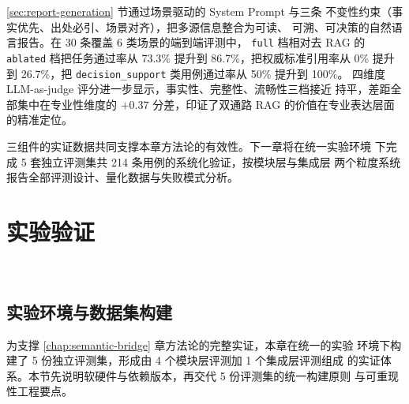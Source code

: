 \documentclass[a4paper]{article}
\newcommand{\sectionbreak}{\clearpage} %
\theoremstyle{definition}
\theoremstyle{plain}
\theoremstyle{remark}
\newcommand{\reftab}[1]{表 \ref{#1}}
\let\oldcite\cite
\renewcommand{\cite}[1]{\textsuperscript{\oldcite{#1}}}
\newcommand{\bk}{\discretionary{}{}{}}
\begin{document}
\ref{sec:report-generation} 节通过场景驱动的 System Prompt 与三条
不变性约束（事实优先、出处必引、场景对齐），把多源信息整合为可读、
可溯、可决策的自然语言报告。在 30 条覆盖 6 类场景的端到端评测中，
\texttt{full} 档相对去 RAG 的 \texttt{ablated} 档把任务通过率从
73.3\% 提升到 86.7\%，把权威标准引用率从 0\% 提升到 26.7\%，把
\texttt{decision\_\bk{}support} 类用例通过率从 50\% 提升到 100\%。
四维度 LLM-as-judge 评分进一步显示，事实性、完整性、流畅性三档接近
持平，差距全部集中在专业性维度的 $+0.37$ 分差，印证了双通路 RAG
的价值在专业表达层面的精准定位。

三组件的实证数据共同支撑本章方法论的有效性。下一章将在统一实验环境
下完成 5 套独立评测集共 214 条用例的系统化验证，按模块层与集成层
两个粒度系统报告全部评测设计、量化数据与失败模式分析。



\sectionbreak

\section{实验验证}
\label{chap:evaluation}

﻿%

\subsection{实验环境与数据集构建}
\label{sec:exp-env}

为支撑 \ref{chap:semantic-bridge} 章方法论的完整实证，本章在统一的实验
环境下构建了 5 份独立评测集，形成由 4 个模块层评测加 1 个集成层评测组成
的实证体系。本节先说明软硬件与依赖版本，再交代 5 份评测集的统一构建原则
与可重现性工程要点。
\end{document}

